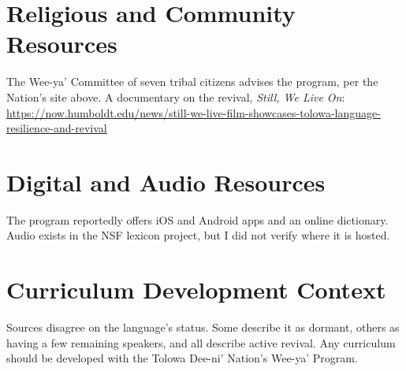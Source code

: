 \documentclass[12pt]{article}
\begin{document}
\section{Religious and Community Resources}
The Wee-ya' Committee of seven tribal citizens advises the program, per the Nation's site above. A documentary on the revival, \emph{Still, We Live On}: \url{https://now.humboldt.edu/news/still-we-live-film-showcases-tolowa-language-resilience-and-revival}

\section{Digital and Audio Resources}
The program reportedly offers iOS and Android apps and an online dictionary. Audio exists in the NSF lexicon project, but I did not verify where it is hosted.

\section{Curriculum Development Context}
Sources disagree on the language's status. Some describe it as dormant, others as having a few remaining speakers, and all describe active revival. Any curriculum should be developed with the Tolowa Dee-ni' Nation's Wee-ya' Program.
\end{document}
